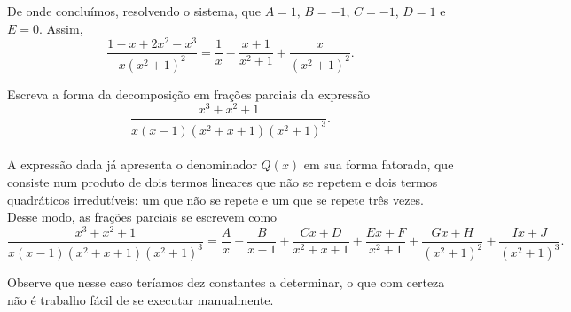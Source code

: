 \begin{exem}
    De onde concluímos, resolvendo o sistema, que $A = 1, \, B = -1$, $C = -1$, $D = 1$ e $E = 0$. Assim, $$\dfrac{1 - x + 2x^2 - x^3}{x(x^2 + 1)^2} = \dfrac{1}{x} - \dfrac{x + 1}{x^2+1} + \dfrac{x}{(x^2+1)^2}.$$
 \end{exem}

\begin{exem}
    Escreva a forma da decomposição em frações parciais da expressão $$\dfrac{x^3 + x^2 + 1}{x(x-1)(x^2 + x + 1)(x^2 + 1)^3}.$$ \\[10pt]

   A expressão dada já apresenta o denominador $Q(x)$ em sua forma fatorada, que consiste num produto de dois termos lineares que não se repetem e dois termos quadráticos irredutíveis: um que não se repete e um que se repete três vezes. Desse modo, as frações parciais se escrevem como 
    \begin{equation*}
    \dfrac{x^3 + x^2 + 1}{x(x-1)(x^2 + x + 1)(x^2 + 1)^3} = \dfrac{A}{x} + \dfrac{B}{x-1} + \dfrac{Cx + D}{x^2+x + 1} + \dfrac{Ex + F}{x^2+1} + \dfrac{Gx + H}{(x^2+1)^2} + \dfrac{Ix + J}{(x^2+1)^3}.
    \end{equation*}

    Observe que nesse caso teríamos dez constantes a determinar, o que com certeza não é trabalho fácil de se executar manualmente.

    \end{exem}

